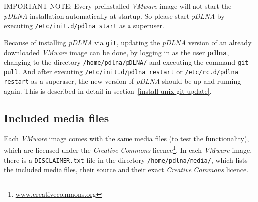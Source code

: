 \documentclass[a4paper,oneside,10pt]{report}
\newenvironment{colframeimportantnote}{%
  \begin{Sbox}
    \begin{minipage}{.99\columnwidth}
}{%
  \end{minipage}
  \end{Sbox}
  \begin{center}
    \fcolorbox{black}{Orange}{\TheSbox}
  \end{center}
}
\begin{document}
\begin{colframeimportantnote}
\textsc{IMPORTANT NOTE:} Every preinstalled {\em VMware} image will not start the {\em pDLNA} installation automatically at startup. So please start {\em pDLNA} by executing \verb|/etc/init.d/pdlna start| as a superuser.
\end{colframeimportantnote}

Because of installing {\em pDLNA} via \verb|git|, updating the {\em pDLNA} version of an already downloaded {\em VMware} image can be done, by logging in as the user \textbf{pdlna}, changing to the directory \verb|/home/pdlna/pDLNA/| and executing the command \verb|git pull|. And after executing \verb|/etc/init.d/pdlna restart| or \verb|/etc/rc.d/pdlna restart| as a superuser, the new version of {\em pDLNA} should be up and running again. This is described in detail in section~\ref{install-unix-git-update}.

\subsection{Included media files}

Each {\em VMware} image comes with the same media files (to test the functionality), which are licensed under the {\em Creative Commons} licence\footnote{\url{www.creativecommons.org}}. In each {\em VMware} image, there is a \verb|DISCLAIMER.txt| file in the directory \verb|/home/pdlna/media/|, which lists the included media files, their source and their exact {\em Creative Commons} licence.
\end{document}
